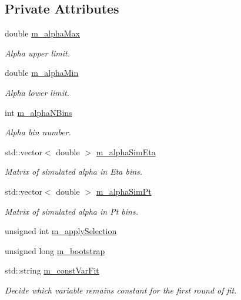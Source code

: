 \subsection*{Private Attributes}
\begin{DoxyCompactItemize}
\item 
double \hyperlink{classTemplateMethod_1_1Setting_a3c58db9629e3125d82a362d089b1aa19}{m\+\_\+alpha\+Max}
\begin{DoxyCompactList}\small\item\em Alpha upper limit. \end{DoxyCompactList}\item 
double \hyperlink{classTemplateMethod_1_1Setting_ace2a02d8d9d9b62f6cac1a141fc54dfc}{m\+\_\+alpha\+Min}
\begin{DoxyCompactList}\small\item\em Alpha lower limit. \end{DoxyCompactList}\item 
int \hyperlink{classTemplateMethod_1_1Setting_a831e7e2d3576aa8341141744fcdfb56d}{m\+\_\+alpha\+N\+Bins}
\begin{DoxyCompactList}\small\item\em Alpha bin number. \end{DoxyCompactList}\item 
std\+::vector$<$ double $>$ \hyperlink{classTemplateMethod_1_1Setting_a094383216ce9e24f79a0f37512f9eb1f}{m\+\_\+alpha\+Sim\+Eta}
\begin{DoxyCompactList}\small\item\em Matrix of simulated alpha in Eta bins. \end{DoxyCompactList}\item 
std\+::vector$<$ double $>$ \hyperlink{classTemplateMethod_1_1Setting_ac97c81e2517538c077a42837e29fd1d6}{m\+\_\+alpha\+Sim\+Pt}
\begin{DoxyCompactList}\small\item\em Matrix of simulated alpha in Pt bins. \end{DoxyCompactList}\item 
unsigned int \hyperlink{classTemplateMethod_1_1Setting_a109bc05d3aa6fa2f07edc011369dc05c}{m\+\_\+apply\+Selection}
\item 
unsigned long \hyperlink{classTemplateMethod_1_1Setting_af22763b32dcd52694fc2fef70a64071a}{m\+\_\+bootstrap}
\item 
std\+::string \hyperlink{classTemplateMethod_1_1Setting_a4ebbe96e846f746bccaf699927c79872}{m\+\_\+const\+Var\+Fit}
\begin{DoxyCompactList}\small\item\em Decide which variable remains constant for the first round of fit. \end{DoxyCompactList}\item 

\end{DoxyCompactItemize}
